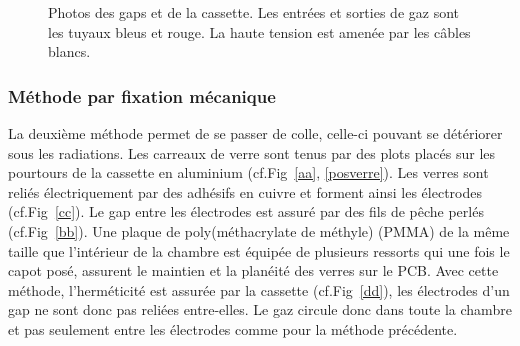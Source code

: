 \begin{figure}[ht!]
\begin{minipage}[t]{.45\textwidth}
    \end{minipage}
 	\caption{Photos des gaps et de la cassette. Les entrées et sorties de gaz sont les tuyaux bleus et rouge. La haute tension est amenée par les câbles blancs.}
 	\label{colle}
 \end{figure}
 
 \subsubsection{Méthode par fixation mécanique}
 La deuxième méthode permet de se passer de colle, celle-ci pouvant se détériorer sous les radiations. Les carreaux de verre sont tenus par des plots placés sur les pourtours de la cassette en aluminium (cf.Fig~\ref{aa}, \ref{posverre}). Les verres sont reliés électriquement par des adhésifs en cuivre et forment ainsi les électrodes (cf.Fig~\ref{cc}). Le gap entre les électrodes est assuré par des fils de pêche perlés (cf.Fig~\ref{bb}). Une plaque de poly(méthacrylate de méthyle) (PMMA) de la même taille que l'intérieur de la chambre est équipée de plusieurs ressorts qui une fois le capot posé, assurent le maintien et la planéité des verres sur le PCB.  Avec cette méthode, l'herméticité est assurée par la cassette (cf.Fig~\ref{dd}), les électrodes d'un gap ne sont donc pas reliées entre-elles. Le gaz circule donc dans toute la chambre et pas seulement entre les électrodes comme pour la méthode précédente.
 
